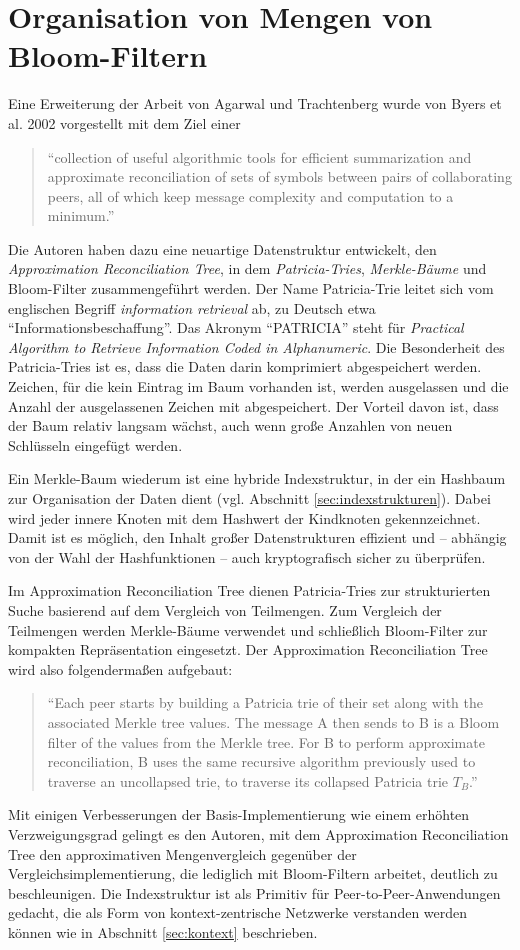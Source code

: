 \section{Organisation von Mengen von Bloom-Filtern}\label{organisation}
Eine Erweiterung der Arbeit von Agarwal und Trachtenberg wurde von Byers et al. 2002 vorgestellt mit dem Ziel einer
\begin{quote}
"`collection of useful algorithmic tools for efficient summarization and approximate reconciliation of sets of symbols between pairs of collaborating peers, all of which keep message complexity and computation to a minimum."' \cite{Byers2002}
\end{quote}
Die Autoren haben dazu eine neuartige Datenstruktur entwickelt, den \textit{Approximation Reconciliation Tree}, in dem \textit{Patricia-Tries}, \textit{Merkle-Bäume} und Bloom-Filter zusammengeführt werden. Der Name Patricia-Trie leitet sich vom englischen Begriff \textit{information retrieval} ab, zu Deutsch etwa "`Informationsbeschaffung"'. Das Akronym "`PATRICIA"' steht für \textit{Practical Algorithm to Retrieve Information Coded in Alphanumeric}. Die Besonderheit des Patricia-Tries ist es, dass die Daten darin komprimiert abgespeichert werden. Zeichen, für die kein Eintrag im Baum vorhanden ist, werden ausgelassen und die Anzahl der ausgelassenen Zeichen mit abgespeichert. Der Vorteil davon ist, dass der Baum relativ langsam wächst, auch wenn große Anzahlen von neuen Schlüsseln eingefügt werden. 

Ein Merkle-Baum wiederum ist eine hybride Indexstruktur, in der ein Hashbaum zur Organisation der Daten dient (vgl. Abschnitt \ref{sec:indexstrukturen}). Dabei wird jeder innere Knoten mit dem Hashwert der Kindknoten gekennzeichnet. Damit ist es möglich, den Inhalt großer Datenstrukturen effizient und -- abhängig von der Wahl der Hashfunktionen -- auch kryptografisch sicher zu überprüfen. 

Im Approximation Reconciliation Tree dienen Patricia-Tries zur strukturierten Suche basierend auf dem Vergleich von Teilmengen. Zum Vergleich der Teilmengen werden Merkle-Bäume verwendet und schließlich Bloom-Filter zur kompakten Repräsentation eingesetzt. Der Approximation Reconciliation Tree wird also folgendermaßen aufgebaut: 
\begin{quote}
"`Each peer starts by building a Patricia trie of their set along with the associated Merkle tree values. The message A then sends to B is a Bloom filter of the values from the Merkle tree. For B to perform approximate reconciliation, B uses the same recursive algorithm previously used to traverse an uncollapsed trie, to traverse its collapsed Patricia trie $T_B$."' \cite{Byers2002}
\end{quote}
Mit einigen Verbesserungen der Basis-Implementierung wie einem erhöhten Verzweigungsgrad gelingt es den Autoren, mit dem Approximation Reconciliation Tree den approximativen Mengenvergleich gegenüber der Vergleichsimplementierung, die lediglich mit Bloom-Filtern arbeitet, deutlich zu beschleunigen. Die Indexstruktur ist als Primitiv für Peer-to-Peer-Anwendungen gedacht, die als Form von kontext-zentrische Netzwerke verstanden werden können wie in Abschnitt \ref{sec:kontext} beschrieben. 
